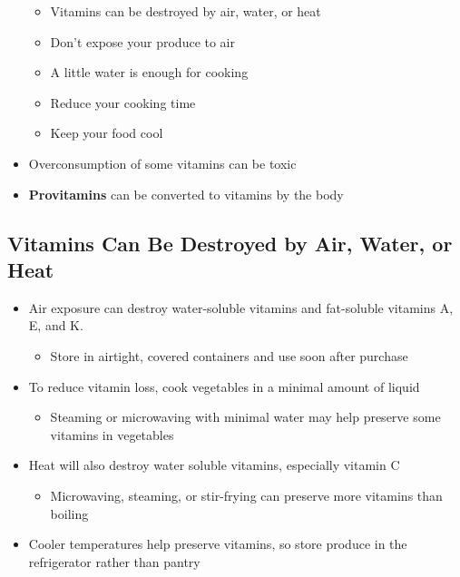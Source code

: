\documentclass[12pt]{article}
\begin{document}
\begin{itemize}
                    \begin{itemize}
                        \item Vitamins can be destroyed by air, water, or heat
                        \item Don't expose your produce to air
                        \item A little water is enough for cooking
                        \item Reduce your cooking time
                        \item Keep your food cool
                    \end{itemize}
                \item Overconsumption of some vitamins can be toxic
                \item \textbf{Provitamins} can be converted to vitamins by the body
            \end{itemize}

        \subsection{Vitamins Can Be Destroyed by Air, Water, or Heat}
            \begin{itemize}
                \item Air exposure can destroy water-soluble vitamins and fat-soluble vitamins A, E, and K.
                    \begin{itemize}
                        \item Store in airtight, covered containers and use soon after purchase
                    \end{itemize}
                \item To reduce vitamin loss, cook vegetables in a minimal amount of liquid
                    \begin{itemize}
                        \item Steaming or microwaving with minimal water may help preserve some vitamins in vegetables
                    \end{itemize}
                \item Heat will also destroy water soluble vitamins, especially vitamin C
                    \begin{itemize}
                        \item Microwaving, steaming, or stir-frying can preserve more vitamins than boiling
                    \end{itemize}
                \item Cooler temperatures help preserve vitamins, so store produce in the refrigerator rather than pantry
            \end{itemize}
\end{document}
